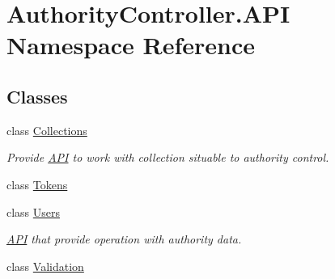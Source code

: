 \hypertarget{namespace_authority_controller_1_1_a_p_i}{}\section{Authority\+Controller.\+A\+PI Namespace Reference}
\label{namespace_authority_controller_1_1_a_p_i}
\subsection*{Classes}
\begin{DoxyCompactItemize}
\item 
class \mbox{\hyperlink{class_authority_controller_1_1_a_p_i_1_1_collections}{Collections}}
\begin{DoxyCompactList}\small\item\em Provide \mbox{\hyperlink{namespace_authority_controller_1_1_a_p_i}{A\+PI}} to work with collection situable to authority control. \end{DoxyCompactList}\item 
class \mbox{\hyperlink{class_authority_controller_1_1_a_p_i_1_1_tokens}{Tokens}}
\item 
class \mbox{\hyperlink{class_authority_controller_1_1_a_p_i_1_1_users}{Users}}
\begin{DoxyCompactList}\small\item\em \mbox{\hyperlink{namespace_authority_controller_1_1_a_p_i}{A\+PI}} that provide operation with authority data. \end{DoxyCompactList}\item 
class \mbox{\hyperlink{class_authority_controller_1_1_a_p_i_1_1_validation}{Validation}}
\end{DoxyCompactItemize}
